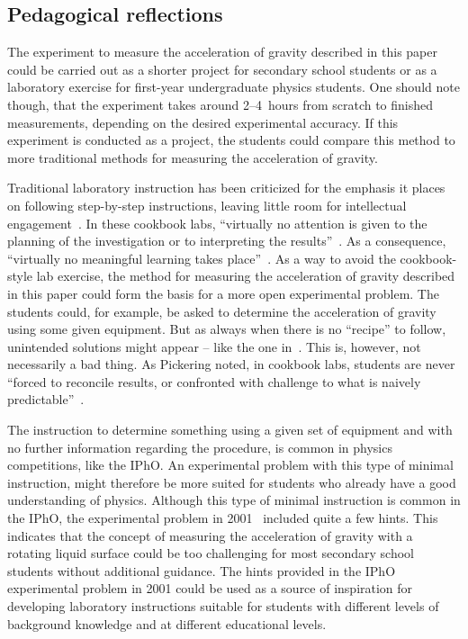 \documentclass[11pt, a4paper, twocolumn, swedish, english]{article}
\begin{document}
\subsection{Pedagogical reflections}

The experiment to measure the acceleration of gravity described in
this paper could be carried out as a shorter project for secondary
school students or as a laboratory exercise for first-year
undergraduate physics students. One should note though, that the
experiment takes around 2--4~hours from scratch to finished
measurements, depending on the desired experimental accuracy. If this
experiment is conducted as a project, the students could compare this
method to more traditional methods for measuring the acceleration of
gravity.

Traditional laboratory instruction has been criticized for the
emphasis it places on following step-by-step instructions, leaving
little room for intellectual engagement~\cite{Domin1999}. In these
cookbook labs, ``virtually no attention is given to the planning of
the investigation or to interpreting the
results''~\cite{Domin1999}. As a consequence, ``virtually no
meaningful learning takes place''~\cite{Domin1999}. As a way to avoid
the cookbook-style lab exercise, the method for measuring the
acceleration of gravity described in this paper could form the basis
for a more open experimental problem. The students could, for example,
be asked to determine the acceleration of gravity using some given
equipment. But as always when there is no ``recipe'' to follow,
unintended solutions might appear – like the one
in~\cite{IPhO2001}. This is, however, not necessarily a bad thing. As
Pickering noted, in cookbook labs, students are never ``forced to
reconcile results, or confronted with challenge to what is naively
predictable''~\cite{Pickering1987}.

The instruction to determine something using a given set of equipment
and with no further information regarding the procedure, is common in
physics competitions, like the IPhO. An experimental problem with this
type of minimal instruction, might therefore be more suited for
students who already have a good understanding of physics. Although
this type of minimal instruction is common in the IPhO, the
experimental problem in 2001~\cite{IPhO2001} included quite a few
hints. This indicates that the concept of measuring the acceleration
of gravity with a rotating liquid surface could be too challenging for
most secondary school students without additional guidance. The hints
provided in the IPhO experimental problem in 2001 could be used as a
source of inspiration for developing laboratory instructions suitable
for students with different levels of background knowledge and at
different educational levels. 
\end{document}

